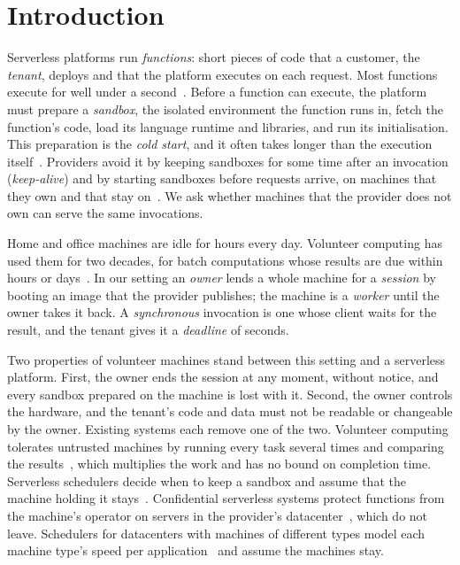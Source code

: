 \section{Introduction}
\label{sec:intro}

Serverless platforms run \emph{functions}: short pieces of code that a customer, the \emph{tenant}, deploys and that
the platform executes on each request. Most functions execute for well under a
second~\cite{shahrad2020wild}. Before a function can execute, the platform must prepare a \emph{sandbox}, the isolated
environment the function runs in, fetch the function's code, load its language runtime and libraries, and run its
initialisation. This preparation is the \emph{cold start}, and it often takes longer than the execution
itself~\cite{shahrad2020wild,brooker2023ondemand}. Providers avoid it by keeping sandboxes for some time after an
invocation (\emph{keep-alive}) and by starting sandboxes before requests arrive, on machines that they own and that
stay on~\cite{shahrad2020wild,agache2020firecracker}. We ask whether machines that the provider does not own can serve
the same invocations.

Home and office machines are idle for hours every day. Volunteer computing has used them for two decades, for batch
computations whose results are due within hours or days~\cite{anderson2004boinc,anderson2002seti}. In our setting an
\emph{owner} lends a whole machine for a \emph{session} by booting an image that the provider publishes; the machine
is a \emph{worker} until the owner takes it back. A \emph{synchronous} invocation is one whose client waits for the
result, and the tenant gives it a \emph{deadline} of seconds.

Two properties of volunteer machines stand between this setting and a serverless platform. First, the owner ends the
session at any moment, without notice, and every sandbox prepared on the machine is lost with it. Second, the owner
controls the hardware, and the tenant's code and data must not be readable or changeable by the owner. Existing
systems each remove one of the two. Volunteer computing tolerates untrusted machines by running every task several
times and comparing the results~\cite{anderson2004boinc}, which multiplies the work and has no bound on completion
time. Serverless schedulers decide when to keep a sandbox and assume that the machine holding it
stays~\cite{shahrad2020wild,fuerst2021faascache}. Confidential serverless systems protect functions from the machine's
operator on servers in the provider's datacenter~\cite{segarra2024sesame,wallet2025}, which do not leave. Schedulers
for datacenters with machines of different types model each machine type's speed per
application~\cite{delimitrou2013paragon,delimitrou2014quasar} and assume the machines stay.

